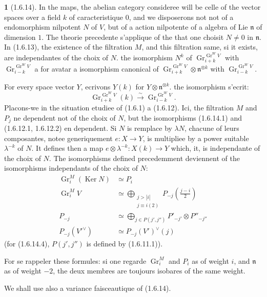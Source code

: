 \documentclass[12pt,a4paper]{article}
\theoremstyle{plain}
\theoremstyle{definition}
\theoremstyle{definition}
\newtheorem{para}{}[section]
\theoremstyle{remark}
\DeclareMathOperator{\Gr}{Gr}
\DeclareMathOperator{\Ker}{Ker}
\begin{document}
\begin{para}[1.6.14]
In the maps, the abelian category consideree will be celle of the vector spaces over a field $k$ of caracteristique $0$, and we disposerons not not of a endomorphism nilpotent $N$ of $V$, but of a action nilpotente of a algebra of Lie $\mathfrak{n}$ of dimension $1$. The theorie precedente s'applique of the that one choisit $N \neq 0$ in $\mathfrak{n}$. In (1.6.13), the existence of the filtration $M$, and this filtration same, si it exists, are independantes of the choix of $N$. the isomorphism $N^k$ of $\Gr_{i+k}^{\Gr^W V}$ with $\Gr_{i-k}^{\Gr^W V}$ a for avatar a isomorphism canonical of $\Gr_{i+k}^{\Gr^W V} \otimes \mathfrak{n}^{\otimes k}$ with $\Gr_{i-k}^{\Gr^W V}$.

For every space vector $Y$, ecrivons $Y(k)$ for $Y \otimes \mathfrak{n}^{\otimes k}$. the isomorphism s'ecrit:
\begin{equation}\tag{1.6.14.1}
\Gr_{i+k}^{\Gr^W V}(k) \xrightarrow{\sim} \Gr_{i-k}^{\Gr^W V}.
\end{equation}
Placons-we in the situation etudiee of (1.6.1) a (1.6.12). Ici, the filtration $M$ and $P_j$ ne dependent not of the choix of $N$, but the isomorphisms (1.6.14.1) and (1.6.12.1, 1.6.12.2) en dependent. Si $N$ is remplace by $\lambda N$, chacune of leurs composantes, notee generiquement $e: X \to Y$, is multipliee by a power suitable $\lambda^{-k}$ of $N$. It defines then a map $e \otimes \lambda^{-k}: X(k) \to Y$ which, it, is independante of the choix of $N$. The isomorphisms defined precedemment deviennent of the isomorphisms independants of the choix of $N$:
\begin{align}
\Gr_i^M(\Ker N) &\simeq P_i \tag{1.6.14.2}\\
\Gr_i^M V &\simeq \bigoplus_{\substack{j > |i| \\ j \equiv i (2)}} P_{-j}(\tfrac{j-i}{2}) \tag{1.6.14.3}\\
P_{-j} &\simeq \bigoplus_{j \in P(j',j'')} P'_{-j'} \otimes P''_{-j''} \tag{1.6.14.4}\\
P_{-j}(V'^\vee) &\simeq P_{-j}(V')^\vee(j) \tag{1.6.14.5}
\end{align}
(for (1.6.14.4), $P(j',j'')$ is defined by (1.6.11.1)).

For se rappeler these formules: si one regarde $\Gr_i^M$ and $P_i$ as of weight $i$, and $\mathfrak{n}$ as of weight $-2$, the deux membres are toujours isobares of the same weight.

We shall use also a variance faisceautique of (1.6.14).
\end{para}
\end{document}
